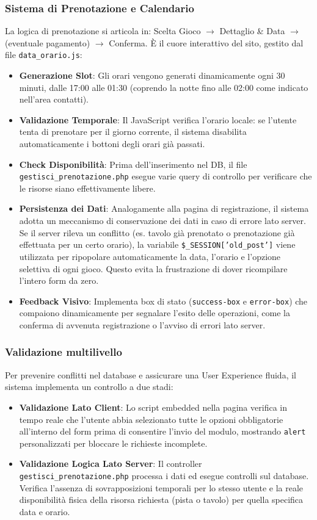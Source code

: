 \documentclass[a4paper, twoside]{report}
\begin{document}
\subsubsection*{Sistema di Prenotazione e Calendario}
La logica di prenotazione si articola in: Scelta Gioco $\rightarrow$ Dettaglio \& Data $\rightarrow$ (eventuale pagamento) $\rightarrow$ Conferma. È il cuore interattivo del sito, gestito dal file \texttt{data\_orario.js}:
\begin{itemize}
  \item \textbf{Generazione Slot}: Gli orari vengono generati dinamicamente ogni 30 minuti, dalle 17:00 alle 01:30 (coprendo la notte fino alle 02:00 come indicato nell'area contatti).
  \item \textbf{Validazione Temporale}: Il JavaScript verifica l'orario locale: se l'utente tenta di prenotare per il giorno corrente, il sistema disabilita automaticamente i bottoni degli orari già passati.
  \item \textbf{Check Disponibilità}: Prima dell'inserimento nel DB, il file \texttt{gestisci\_prenotazione.php} esegue varie query di controllo per verificare che le risorse siano effettivamente libere.
  \item \textbf{Persistenza dei Dati}: Analogamente alla pagina di registrazione, il sistema adotta un meccanismo di conservazione dei dati in caso di errore lato server. Se il server rileva un conflitto (es. tavolo già prenotato o prenotazione già effettuata per un certo orario), la variabile \texttt{\$\_SESSION['old\_post']} viene utilizzata per ripopolare automaticamente la data, l'orario e l’opzione selettiva di ogni gioco. Questo evita la frustrazione di dover ricompilare l'intero form da zero.
  \item \textbf{Feedback Visivo}: Implementa box di stato (\texttt{success-box} e \texttt{error-box}) che compaiono dinamicamente per segnalare l'esito delle operazioni, come la conferma di avvenuta registrazione o l'avviso di errori lato server.
\end{itemize}
\subsubsection*{Validazione multilivello}
Per prevenire conflitti nel database e assicurare una User Experience fluida, il sistema implementa un controllo a due stadi:
\begin{itemize}
  \item \textbf{Validazione Lato Client}: Lo script embedded nella pagina verifica in tempo reale che l'utente abbia selezionato tutte le opzioni obbligatorie all’interno del form prima di consentire l'invio del modulo, mostrando \texttt{alert} personalizzati per bloccare le richieste incomplete.
  \item \textbf{Validazione Logica Lato Server}: Il controller \texttt{gestisci\_prenotazione.php} processa i dati ed esegue controlli sul database. Verifica l'assenza di sovrapposizioni temporali per lo stesso utente e la reale disponibilità fisica della risorsa richiesta (pista o tavolo) per quella specifica data e orario.
\end{itemize}
\end{document}
